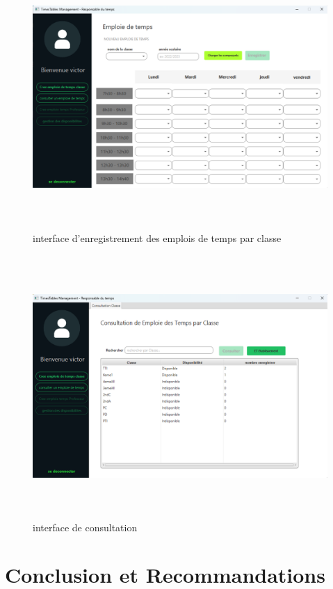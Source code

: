 \documentclass[english,12pt,a4paper]{report}
\begin{document}
\begin{figure}[h]
	\centering
	\includegraphics*[height=10cm, width=12cm]{enregistrementEmploiTempsClasse.png}
	\caption{interface d'enregistrement des emplois de temps par classe}
	\label{fig15: enregistrementEmploieTempsClasse}
\end{figure} 

\begin{figure}[h]
	\centering
	\includegraphics*[height=10cm, width=12cm]{interfaceConsultationEmploiTemps.png}
	\caption{interface de consultation}
	\label{fig16: consultation}
\end{figure} 

\chapter{Conclusion et Recommandations}
\end{document}
